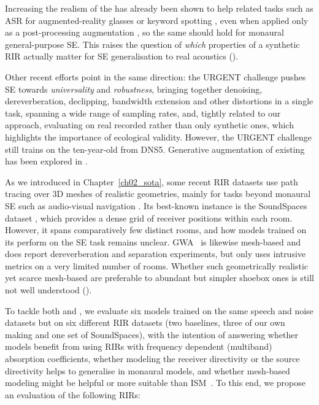 Increasing the realism of the 
has already been shown to help related tasks such as \acrshort{ASR} for
augmented-reality glasses \citep{arakawa2024quantifying} or keyword spotting
\citep{bezzam2020study}, even when applied only as a post-processing
augmentation \citep{ratnarajah2021ts}, so the same should hold for monaural general-purpose \acrshort{SE}. This raises the question of \emph{which} properties of a synthetic \acrshort{RIR} actually matter for \acrshort{SE} generalisation to real acoustics ().

Other recent efforts point in the same direction: the URGENT challenge \citep{zhang2024urgent} pushes \acrshort{SE}
towards \emph{universality} and \emph{robustness}, bringing together
denoising, dereverberation, declipping, bandwidth extension and other
distortions in a single task, spanning a wide range of sampling rates, and, tightly related to our approach, evaluating on real recorded 
rather than only synthetic ones, which highlights the importance of ecological validity. However, the URGENT challenge still
trains on the ten-year-old  from \acrshort{DNS}5. Generative augmentation of existing
 has been explored in \citet{lin2025generative}.

As we introduced in Chapter~\ref{ch02_sota}, some recent \acrshort{RIR} datasets use path tracing over 3D meshes of realistic geometries, mainly for tasks beyond
monaural \acrshort{SE} such as audio-visual navigation
\citep{kelley2024rir, tang2022gwa}. Its best-known instance is the SoundSpaces
dataset \citep{chen2022soundspaces}, which provides a dense grid of receiver
positions within each room. However, it
spans comparatively few distinct rooms, and how models trained on its  perform on the \acrshort{SE} task remains unclear. GWA~\citep{tang2022gwa} is likewise mesh-based and does report
dereverberation and separation experiments, but only uses intrusive metrics on a very limited number of rooms. Whether such geometrically realistic
yet scarce mesh-based  are preferable to abundant but simpler
shoebox ones is still not well understood ().

To tackle both  and , 
we evaluate six models trained on the same speech and noise datasets but on six different \acrshort{RIR} datasets (two baselines, three of our own making and one set of SoundSpaces), with the intention of answering whether models benefit from using RIRs with frequency dependent (multiband) absorption coefficients, whether modeling the receiver directivity or the source directivity helps to generalise in monaural models, and whether mesh-based modeling might be helpful or more suitable than \acrshort{ISM}~\citep{bezzam2020study}. To this end, we propose an evaluation of the following RIRs:


